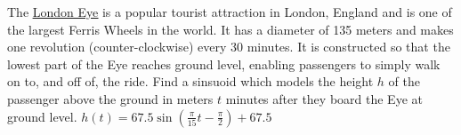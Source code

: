 { \label{heightlondoneye} The \href{http://en.wikipedia.org/wiki/London_Eye}{\underline{London Eye}} is a popular tourist attraction in London, England and is one of the largest Ferris Wheels in the world.  It has a diameter of 135 meters and makes one revolution (counter-clockwise) every 30 minutes.  It is constructed so that the lowest part of the Eye reaches ground level, enabling passengers to simply walk on to, and off of, the ride.  Find a sinsuoid which models the height $h$ of the passenger above the ground in meters $t$ minutes after they board the Eye at ground level.}
{$h(t) = 67.5 \sin\left(\frac{\pi}{15} t - \frac{\pi}{2} \right) + 67.5$}
